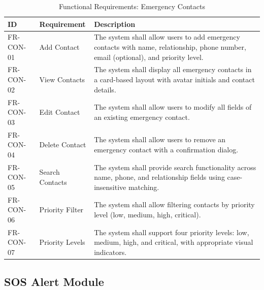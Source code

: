 \begin{table}[H]
  \centering
  \caption{Functional Requirements: Emergency Contacts}
  \label{tab:fr-contacts}
  \begin{tabularx}{\textwidth}{@{}l l X@{}}
    \toprule
    \textbf{ID} & \textbf{Requirement} & \textbf{Description} \\
    \midrule
    FR-CON-01 & Add Contact & The system shall allow users to add emergency contacts with name, relationship, phone number, email (optional), and priority level. \\
    FR-CON-02 & View Contacts & The system shall display all emergency contacts in a card-based layout with avatar initials and contact details. \\
    FR-CON-03 & Edit Contact & The system shall allow users to modify all fields of an existing emergency contact. \\
    FR-CON-04 & Delete Contact & The system shall allow users to remove an emergency contact with a confirmation dialog. \\
    FR-CON-05 & Search Contacts & The system shall provide search functionality across name, phone, and relationship fields using case-insensitive matching. \\
    FR-CON-06 & Priority Filter & The system shall allow filtering contacts by priority level (low, medium, high, critical). \\
    FR-CON-07 & Priority Levels & The system shall support four priority levels: low, medium, high, and critical, with appropriate visual indicators. \\
    \bottomrule
  \end{tabularx}
\end{table}

\subsection{SOS Alert Module}

